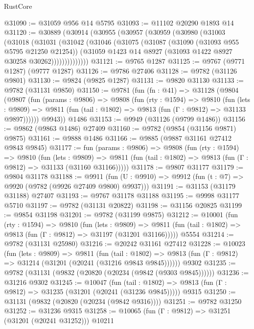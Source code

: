 \begin{lexlean}{RustCore}
\begin{coremodule}
@31090 := @31059 @956 @14 @5795
@31093 := @11102 @20290 @1893 @14
@31120 := @30889
    (@30914
      (@30955
        (@30957
          (@30959
            (@30980
              (@31003
                (@31018
                  (@31031
                    (@31042
                      (@31046
                        (@31075
                          (@31087
                            (@31090 (@31093 @955 @5795 @21250 @21254))
                            (@31059 @1423 @14 @8927 (@31093 @1422 @8927 @30258 @30262))))))))))))))
@31121 := @9765 @1287
@31125 := @9767 (@9771 @1287) (@9777 @1287)
@31126 := @9786 @27406
@31128 := @9782 (@31126 @9801)
@31130 := @9824 (@9825 @1287)
@31131 := @9820 @31130
@31133 := @9782 (@31131 @9850)
@31150 := @9781
    (fun (fn : @41) =>
    @31128
      (@9804
        (@9807
          (fun (params : @9806) =>
          @9808
            (fun (rty : @1594) =>
            @9810
              (fun (lets : @9809) =>
              @9811 (fun (tail : @1802) => @9813 (fun (Γ : @9812) => @31133 @9897))))))
        @9943))
    @1486
@31153 := @9949 (@31126 (@9799 @1486))
@31156 := @9862 (@9863 @1486) @27409
@31160 := @9782 (@9854 (@31156 @9871) @9875)
@31161 := @9888 @1486
@31166 := @9885 (@9887 @31161 @27412 @9843 @9845)
@31177 := fun (params : @9806) =>
  @9808
    (fun (rty : @1594) =>
    @9810
      (fun (lets : @9809) =>
      @9811 (fun (tail : @1802) => @9813 (fun (Γ : @9812) => @31133 (@31160 @31166)))))
@31178 := @9807 @31177
@31179 := @9804 @31178
@31188 := @9911
    (fun (U : @9910) => @9912 (fun (t : @7) => @9920 (@9782 (@9926 @27409 @9800) @9937)))
@31191 := @31153 (@31179 @31188) @27407
@31193 := @9767 @31178 @31188
@31195 := @9998 @31177 @5710
@31197 := @9782 (@31131 @20822)
@31198 := @31156 @20825
@31199 := @9854 @31198
@31201 := @9782 (@31199 @9875)
@31212 := @10001
    (fun (rty : @1594) =>
    @9810
      (fun (lets : @9809) =>
      @9811 (fun (tail : @1802) => @9813 (fun (Γ : @9812) => @31197 (@31201 @31166)))))
    @5554
@31214 := @9782 (@31131 @25980)
@31216 := @20242 @31161 @27412
@31228 := @10023
    (fun (lets : @9809) =>
    @9811
      (fun (tail : @1802) =>
      @9813 (fun (Γ : @9812) => @31214 (@31201 (@20241 (@31216 @9843 @9845))))))
    @9302
@31235 := @9782 (@31131 (@9832 (@20820 (@20234 (@9842 (@9303 @9845))))))
@31236 := @31216 @9302
@31245 := @10047
    (fun (tail : @1802) => @9813 (fun (Γ : @9812) => @31235 (@31201 (@20241 (@31236 @9845)))))
    @9315
@31250 := @31131 (@9832 (@20820 (@20234 (@9842 @9316))))
@31251 := @9782 @31250
@31252 := @31236 @9315
@31258 := @10065 (fun (Γ : @9812) => @31251 (@31201 (@20241 @31252))) @10211

\end{coremodule}
\end{lexlean}
